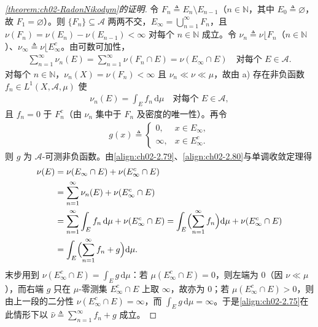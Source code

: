 \documentclass[../../main.tex]{subfiles}%
\begin{document}
\begin{proof}[\cref{theorem:ch02-RadonNikodym}的证明]
令 $F_n\triangleq E_n\setminus E_{n-1}$（$n\in\mathbb N$，其中 $E_0\triangleq\varnothing$，故 $F_1=\varnothing$）。则 $\{F_n\}\subseteq\mathscr A$ 两两不交，$E_\infty=\bigcup_{n=1}^\infty F_n$，且 $\nu(F_n)=\nu(E_n)-\nu(E_{n-1})<\infty$ 对每个 $n\in\mathbb N$ 成立。令 $\nu_n\triangleq\nu\lfloor F_n$（$n\in\mathbb N$）、$\nu_\infty\triangleq\nu\lfloor E_\infty^c$。由可数可加性，
\begin{align}
\sum_{n=1}^\infty\nu_n(E)=\sum_{n=1}^\infty\nu(F_n\cap E)=\nu(E_\infty\cap E)\quad\text{对每个 }E\in\mathscr A. \label{align:ch02-2.79}
\end{align}
对每个 $n\in\mathbb N$，$\nu_n(X)=\nu(F_n)<\infty$ 且 $\nu_n\ll\nu\ll\mu$，故由 a) 存在非负函数 $f_n\in L^1(X,\mathscr A,\mu)$ 使
\begin{align}
\nu_n(E)=\int_Ef_n\,\mathrm{d}\mu\quad\text{对每个 }E\in\mathscr A, \label{align:ch02-2.80}
\end{align}
且 $f_n=0$ 于 $F_n^c$（由 $\nu_n$ 集中于 $F_n$ 及密度的唯一性）。再令
\begin{align*}
g(x)\triangleq
\begin{cases}
0, & x\in E_\infty,\\
\infty, & x\in E_\infty^c.
\end{cases}
\end{align*}
则 $g$ 为 $\mathscr A$-可测非负函数。由\eqref{align:ch02-2.79}、\eqref{align:ch02-2.80}与单调收敛定理得
\begin{align}
\nu(E)&=\nu(E_\infty\cap E)+\nu(E_\infty^c\cap E)\notag\\
&=\sum_{n=1}^\infty\nu_n(E)+\nu(E_\infty^c\cap E)\notag\\
&=\sum_{n=1}^\infty\int_Ef_n\,\mathrm{d}\mu+\nu(E_\infty^c\cap E)=\int_E\Bigl(\sum_{n=1}^\infty f_n\Bigr)\mathrm{d}\mu+\nu(E_\infty^c\cap E)\notag\\
&=\int_E\Bigl(\sum_{n=1}^\infty f_n+g\Bigr)\mathrm{d}\mu. \label{align:ch02-2.81}
\end{align}
末步用到 $\nu(E_\infty^c\cap E)=\int_Eg\,\mathrm{d}\mu$：若 $\mu(E_\infty^c\cap E)=0$，则左端为 $0$（因 $\nu\ll\mu$），而右端 $g$ 只在 $\mu$-零测集 $E_\infty^c\cap E$ 上取 $\infty$，故亦为 $0$；若 $\mu(E_\infty^c\cap E)>0$，则由上一段的二分性 $\nu(E_\infty^c\cap E)=\infty$，而 $\int_Eg\,\mathrm{d}\mu=\infty$。于是\eqref{align:ch02-2.75}在此情形下以 $\hat\nu\triangleq\sum_{n=1}^\infty f_n+g$ 成立。


\end{proof}
\end{document}
